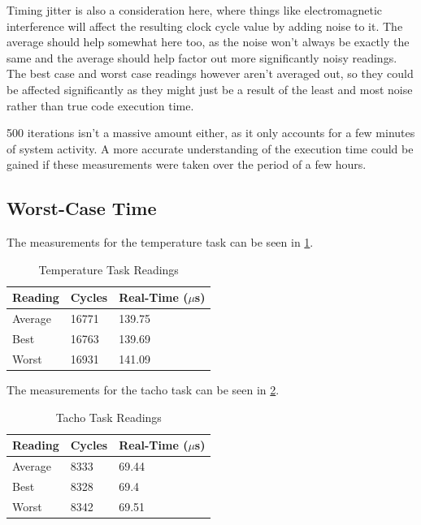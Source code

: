 \documentclass[]{report}
\begin{document}
			Timing jitter is also a consideration here, where things like electromagnetic interference will affect the resulting clock cycle value by adding noise to it. The average should help somewhat here too, as the noise won't always be exactly the same and the average should help factor out more significantly noisy readings. The best case and worst case readings however aren't averaged out, so they could be affected significantly as they might just be a result of the least and most noise rather than true code execution time.
			
			500 iterations isn't a massive amount either, as it only accounts for a few minutes of system activity. A more accurate understanding of the execution time could be gained if these measurements were taken over the period of a few hours.
			
			\subsection{Worst-Case Time}
			The measurements for the temperature task can be seen in \ref{executionmeasurementstemp}.
			
			\begin{table}[h]
				\centering
				\begin{tabular}{| l | l | l |} 
					\hline
					Reading & Cycles & Real-Time ($\mu $s) \\ [0.5ex] 
					\hline
					Average  & 16771 & 139.75 \\ 
					Best & 16763 & 139.69 \\
					Worst & 16931 & 141.09 \\
					\hline
				\end{tabular}
				\caption{Temperature Task Readings}
				\label{executionmeasurementstemp}
			\end{table}
		
			The measurements for the tacho task can be seen in \ref{executionmeasurementstacho}.
			
			\begin{table}[h]
				\centering
				\begin{tabular}{| l | l | l |} 
					\hline
					Reading & Cycles & Real-Time ($\mu $s) \\ [0.5ex] 
					\hline
					Average  & 8333 & 69.44 \\ 
					Best & 8328 & 69.4 \\
					Worst & 8342 & 69.51 \\
					\hline
				\end{tabular}
				\caption{Tacho Task Readings}
				\label{executionmeasurementstacho}
			\end{table}
		
\end{document}
